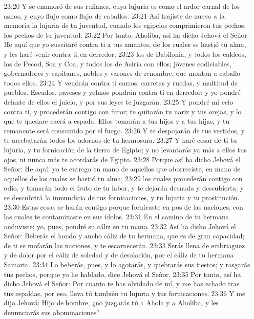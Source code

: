 23:20 Y se enamoró de sus rufianes, cuya lujuria es como el ardor carnal de los asnos, y cuyo flujo como flujo de caballos.   
23:21 Así trajiste de nuevo a la memoria la lujuria de tu juventud, cuando los egipcios comprimieron tus pechos, los pechos de tu juventud.   
23:22 Por tanto, Aholiba, así ha dicho Jehová el Señor: He aquí que yo suscitaré contra ti a tus amantes, de los cuales se hastió tu alma, y les haré venir contra ti en derredor;   
23:23 los de Babilonia, y todos los caldeos, los de Pecod, Soa y Coa, y todos los de Asiria con ellos; jóvenes codiciables, gobernadores y capitanes, nobles y varones de renombre, que montan a caballo todos ellos.   
23:24 Y vendrán contra ti carros, carretas y ruedas, y multitud de pueblos. Escudos, paveses y yelmos pondrán contra ti en derredor; y yo pondré delante de ellos el juicio, y por sus leyes te juzgarán.   
23:25 Y pondré mi celo contra ti, y procederán contigo con furor; te quitarán tu nariz y tus orejas, y lo que te quedare caerá a espada. Ellos tomarán a tus hijos y a tus hijas, y tu remanente será consumido por el fuego.   
23:26 Y te despojarán de tus vestidos, y te arrebatarán todos los adornos de tu hermosura.   
23:27 Y haré cesar de ti tu lujuria, y tu fornicación de la tierra de Egipto; y no levantarás ya más a ellos tus ojos, ni nunca más te acordarás de Egipto.   
23:28 Porque así ha dicho Jehová el Señor: He aquí, yo te entrego en mano de aquellos que aborreciste, en mano de aquellos de los cuales se hastió tu alma;   
23:29 los cuales procederán contigo con odio, y tomarán todo el fruto de tu labor, y te dejarán desnuda y descubierta; y se descubrirá la inmundicia de tus fornicaciones, y tu lujuria y tu prostitución.   
23:30 Estas cosas se harán contigo porque fornicaste en pos de las naciones, con las cuales te contaminaste en sus ídolos.   
23:31 En el camino de tu hermana anduviste; yo, pues, pondré su cáliz en tu mano.   
23:32 Así ha dicho Jehová el Señor: Beberás el hondo y ancho cáliz de tu hermana, que es de gran capacidad; de ti se mofarán las naciones, y te escarnecerán.   
23:33 Serás llena de embriaguez y de dolor por el cáliz de soledad y de desolación, por el cáliz de tu hermana Samaria.   
23:34 Lo beberás, pues, y lo agotarás, y quebrarás sus tiestos; y rasgarás tus pechos, porque yo he hablado, dice Jehová el Señor.   
23:35 Por tanto, así ha dicho Jehová el Señor: Por cuanto te has olvidado de mí, y me has echado tras tus espaldas, por eso, lleva tú también tu lujuria y tus fornicaciones.   
23:36 Y me dijo Jehová: Hijo de hombre, ¿no juzgarás tú a Ahola y a Aholiba, y les denunciarás sus abominaciones?   
